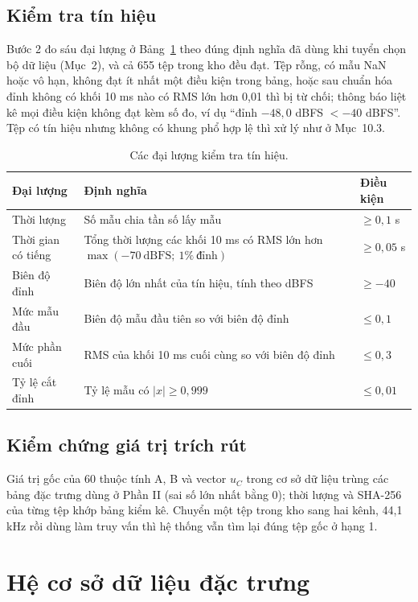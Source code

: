 \documentclass[11pt,a4paper]{article}
\begin{document}
\subsection{Kiểm tra tín hiệu}\label{sec:kiemtratinhieu}
Bước 2 đo sáu đại lượng ở Bảng~\ref{tab:kiemtra} theo đúng định nghĩa đã dùng khi tuyển chọn bộ dữ liệu (Mục~2), và cả 655 tệp trong kho đều đạt. Tệp rỗng, có mẫu NaN hoặc vô hạn, không đạt ít nhất một điều kiện trong bảng, hoặc sau chuẩn hóa đỉnh không có khối 10 ms nào có RMS lớn hơn 0,01 thì bị từ chối; thông báo liệt kê mọi điều kiện không đạt kèm số đo, ví dụ ``đỉnh $-48{,}0$ dBFS $<-40$ dBFS''. Tệp có tín hiệu nhưng không có khung phổ hợp lệ thì xử lý như ở Mục~10.3.
\begin{table}[htbp]
\centering\small
\caption{Các đại lượng kiểm tra tín hiệu.}\label{tab:kiemtra}
\begin{tabularx}{\textwidth}{p{}Xl}
\toprule
Đại lượng & Định nghĩa & Điều kiện\\\midrule
Thời lượng & Số mẫu chia tần số lấy mẫu & $\ge 0{,}1$ s\\
Thời gian có tiếng & Tổng thời lượng các khối 10 ms có RMS lớn hơn $\max(-70\ \text{dBFS};\ 1\%\ \text{đỉnh})$ & $\ge 0{,}05$ s\\
Biên độ đỉnh & Biên độ lớn nhất của tín hiệu, tính theo dBFS & $\ge -40$\\
Mức mẫu đầu & Biên độ mẫu đầu tiên so với biên độ đỉnh & $\le 0{,}1$\\
Mức phần cuối & RMS của khối 10 ms cuối cùng so với biên độ đỉnh & $\le 0{,}3$\\
Tỷ lệ cắt đỉnh & Tỷ lệ mẫu có $|x|\ge0{,}999$ & $\le 0{,}01$\\\bottomrule
\end{tabularx}
\end{table}

\subsection{Kiểm chứng giá trị trích rút}
Giá trị gốc của 60 thuộc tính A, B và vector $u_C$ trong cơ sở dữ liệu trùng các bảng đặc trưng dùng ở Phần II (sai số lớn nhất bằng 0); thời lượng và SHA-256 của từng tệp khớp bảng kiểm kê. Chuyển một tệp trong kho sang hai kênh, 44,1 kHz rồi dùng làm truy vấn thì hệ thống vẫn tìm lại đúng tệp gốc ở hạng 1.

\section{Hệ cơ sở dữ liệu đặc trưng}\label{sec:csdl}
\end{document}

